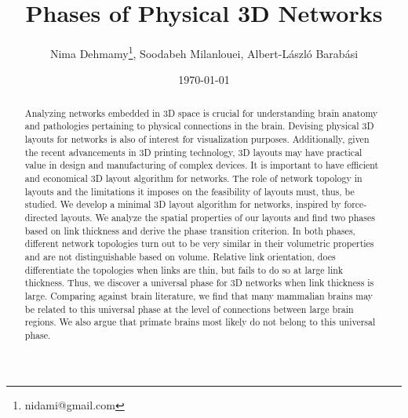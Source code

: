 \documentclass[nofootinbib,preprint,endfloats]{revtex4} %
\begin{document}
\title{Phases of Physical 3D Networks}
\author{Nima Dehmamy\thanks{nidami@gmail.com}, Soodabeh Milanlouei, Albert-L\'aszl\'o Barab\'asi}
\date{\today}

\begin{abstract}
Analyzing networks embedded in 3D space is crucial for understanding brain anatomy and pathologies pertaining to physical connections in the brain. 
Devising physical 3D layouts for networks is also of interest for  visualization purposes.
Additionally, given the recent advancements in 3D printing technology, 3D layouts may have practical value in design and manufacturing of complex devices. 
It is important to have efficient and economical 3D layout algorithm for networks. 
The role of network topology in layouts and the limitations it imposes on the feasibility of layouts must, thus, be studied.
We develop a minimal 3D layout algorithm for networks, inspired by force-directed layouts. 
We analyze the spatial properties of our layouts and find two phases based on link thickness and derive the phase transition criterion.  
In both phases, different network topologies turn out to be very similar in their volumetric properties and are not distinguishable based on volume. 
Relative link orientation, does differentiate the topologies when links are thin, but fails to do so at large link thickness. 
Thus, we discover a universal phase for 3D networks when link thickness is large.
Comparing against brain literature, we find that many mammalian brains may be related to this universal phase at the level of connections between large brain regions.  
We also argue that primate brains most likely do not belong to this universal phase. 
\end{abstract}

\maketitle


\end{document}
